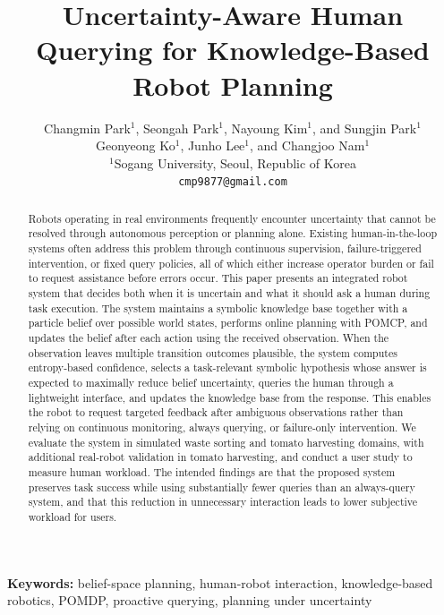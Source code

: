 \documentclass[12pt]{article}
\title{Uncertainty-Aware Human Querying for Knowledge-Based Robot Planning}
\author{
Changmin Park$^{1}$,
Seongah Park$^{1}$,
Nayoung Kim$^{1}$,
and Sungjin Park$^{1}$\\
Geonyeong Ko$^{1}$,
Junho Lee$^{1}$,
and Changjoo Nam$^{1}$\\
$^{1}$Sogang University, Seoul, Republic of Korea\\
\texttt{cmp9877@gmail.com}
}
\date{}
\begin{document}
\maketitle

\begin{abstract}
Robots operating in real environments frequently encounter uncertainty that cannot be resolved through autonomous perception or planning alone. Existing human-in-the-loop systems often address this problem through continuous supervision, failure-triggered intervention, or fixed query policies, all of which either increase operator burden or fail to request assistance before errors occur. This paper presents an integrated robot system that decides both when it is uncertain and what it should ask a human during task execution. The system maintains a symbolic knowledge base together with a particle belief over possible world states, performs online planning with POMCP, and updates the belief after each action using the received observation. When the observation leaves multiple transition outcomes plausible, the system computes entropy-based confidence, selects a task-relevant symbolic hypothesis whose answer is expected to maximally reduce belief uncertainty, queries the human through a lightweight interface, and updates the knowledge base from the response. This enables the robot to request targeted feedback after ambiguous observations rather than relying on continuous monitoring, always querying, or failure-only intervention. We evaluate the system in simulated waste sorting and tomato harvesting domains, with additional real-robot validation in tomato harvesting, and conduct a user study to measure human workload. The intended findings are that the proposed system preserves task success while using substantially fewer queries than an always-query system, and that this reduction in unnecessary interaction leads to lower subjective workload for users.
\end{abstract}

\noindent\textbf{Keywords:} belief-space planning, human-robot interaction, knowledge-based robotics, POMDP, proactive querying, planning under uncertainty












\appendix

\end{document}
